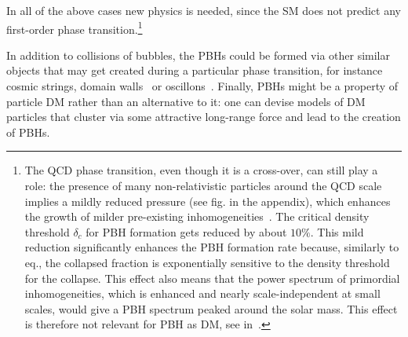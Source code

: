  In all of the above cases new physics is needed, since the SM does not predict any first-order phase transition.\footnote{The QCD phase transition, even though it is a cross-over, can still play a role:
the presence of many non-relativistic particles around the QCD scale implies a mildly reduced pressure (see fig. in the appendix), which enhances the growth of  milder pre-existing inhomogeneities~\cite{PBHformationTh}.
The critical density threshold $\delta_c$ for PBH formation gets reduced by about $10\%$.
This mild reduction significantly enhances the PBH formation rate because,
similarly to eq., the collapsed fraction is exponentially sensitive to the density threshold for the collapse.
This effect also means that the power spectrum of primordial inhomogeneities,
which is enhanced and nearly scale-independent at small scales, 
would give a PBH spectrum peaked around the solar mass.
This effect is therefore not relevant for PBH as DM, see  in~\cite{PBHformationTh}.}

\medskip


In addition to collisions of bubbles, 
the PBHs could be formed via other similar objects that may get created during a particular phase transition, for instance cosmic strings, domain walls~\cite{PBHformationPhaseTransition} or oscillons~\cite{PBHformationOscillon}. 
Finally, PBHs might be a property of particle DM rather than an alternative to it:
one can devise models of DM particles that cluster via some attractive long-range force and lead to the creation of PBHs.



